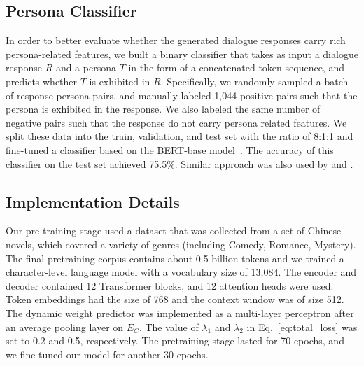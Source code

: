 \documentclass[letterpaper]{article}
\newcommand{\citet}[1]{\citeauthor{#1} \shortcite{#1}}
\newcommand{\citep}{\cite}
\begin{document}
\subsection{Persona Classifier}\label{sec:persona_cls}
In order to better evaluate whether the generated dialogue responses carry rich persona-related features, we built a binary classifier that takes as input a dialogue response $R$ and a persona $T$ in the form of a concatenated token sequence, and predicts whether $T$ is exhibited in $R$. Specifically, we randomly sampled a batch of response-persona pairs, and manually labeled 1,044 positive pairs such that the persona is exhibited in the response. We also labeled the same number of negative pairs such that the response do not carry persona related features. We split these data into the train, validation, and test set with the ratio of 8:1:1 and fine-tuned a classifier based on the BERT-base model~\citep{devlin2018bert}. The accuracy of this classifier on the test set achieved 75.5\%. Similar approach was also used by \citet{zhou2018emotional} and \citet{zheng2019Personal}.

\subsection{Implementation Details}
Our pre-training stage used a dataset that was collected from a set of Chinese novels, which covered a variety of genres (including Comedy, Romance, Mystery). The final pretraining corpus contains about 0.5 billion tokens and we trained a character-level language model with a vocabulary size of 13,084. The encoder and decoder contained 12 Transformer blocks, and 12 attention heads were used. Token embeddings had the size of 768 and the context window was of size 512. The dynamic weight predictor was implemented as a multi-layer perceptron after an average pooling layer on $E_C$. The value of $\lambda_1$ and $\lambda_2$ in Eq.~\ref{eq:total_loss} was set to 0.2 and 0.5, respectively. The pretraining stage lasted for 70 epochs, and we fine-tuned our model for another 30 epochs.
\end{document}

